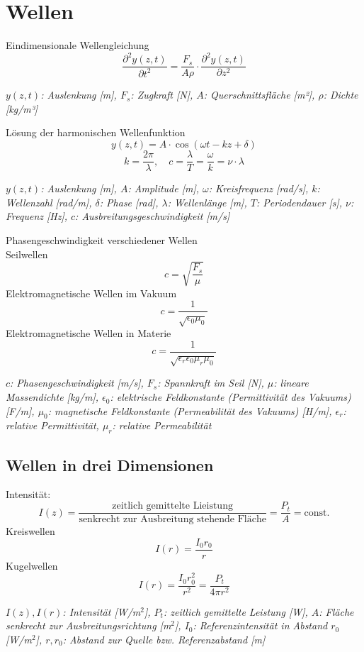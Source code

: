 \documentclass[a4paper,10pt]{article}
\newenvironment{displayformula}
{
	\begin{framed}
		\color{formulaColor}
	}
	{\end{framed}}
\newcommand{\formulalegend}[1]{%
	\par\vspace{0.5ex}%
	{{\color{legendColor}\RaggedRight\small\textit{#1}}}%
	\par\vspace{1.5ex}%
}
\begin{document}
\section{Wellen}

\begin{displayformula}
	Eindimensionale Wellengleichung
	\[
	\frac{\partial^2 y(z,t)}{\partial t^2} = \frac{F_s}{A \rho} \cdot \frac{\partial^2 y(z,t)}{\partial z^2}
	\]
\end{displayformula}
\formulalegend{
	\( y(z,t) \): Auslenkung [m], \( F_s \): Zugkraft [N], \( A \): Querschnittsfläche [m²], \( \rho \): Dichte [kg/m³]
}

\begin{displayformula}
	Lösung der harmonischen Wellenfunktion
	\[
	y(z, t) = A \cdot \cos(\omega t - kz + \delta)
	\]
	\[
	k = \frac{2\pi}{\lambda}, \quad c = \frac{\lambda}{T} = \frac{\omega}{k} = \nu \cdot \lambda
	\]
\end{displayformula}
\formulalegend{
	\( y(z,t) \): Auslenkung [m], \( A \): Amplitude [m], \( \omega \): Kreisfrequenz [rad/s], \( k \): Wellenzahl [rad/m], \( \delta \): Phase [rad], \( \lambda \): Wellenlänge [m], \( T \): Periodendauer [s], \( \nu \): Frequenz [Hz], \( c \): Ausbreitungsgeschwindigkeit [m/s]
}


\begin{displayformula}
	Phasengeschwindigkeit verschiedener Wellen \\ 
	Seilwellen
	\[
	c = \sqrt{\frac{F_s}{\mu}}
	\]
	Elektromagnetische Wellen im Vakuum
	\[
	c = \frac{1}{\sqrt{\epsilon_0 \mu_0}}
	\]
	Elektromagnetische Wellen in Materie
	\[
	c = \frac{1}{\sqrt{\epsilon_r \epsilon_0 \mu_r \mu_0}}
	\]
\end{displayformula}
\formulalegend{
	\( c \): Phasengeschwindigkeit [m/s], 
	\( F_s \): Spannkraft im Seil [N], 
	\( \mu \): lineare Massendichte [kg/m], 
	\( \epsilon_0 \): elektrische Feldkonstante (Permittivität des Vakuums) [F/m], 
	\( \mu_0 \): magnetische Feldkonstante (Permeabilität des Vakuums) [H/m], 
	\( \epsilon_r \): relative Permittivität, 
	\( \mu_r \): relative Permeabilität
}

\subsection{Wellen in drei Dimensionen}
\begin{displayformula}
	Intensität:
	\[
	I(z) = \frac{\text{zeitlich gemittelte Lieistung}}{\text{senkrecht zur Ausbreitung stehende Fläche}} = \frac{P_t}{A} = \text{const.}
	\]
	Kreiswellen
	\[
	I(r) = \frac{I_0r_0}{r}
	\]
	Kugelwellen
	\[
	I(r) = \frac{I_0r_0^2}{r^2} = \frac{P_t}{4\pi r^2}
	\]
\end{displayformula}
\formulalegend{
	\( I(z), I(r) \): Intensität [W/m\(^2\)], 
	\( P_t \): zeitlich gemittelte Leistung [W], 
	\( A \): Fläche senkrecht zur Ausbreitungsrichtung [m\(^2\)], 
	\( I_0 \): Referenzintensität in Abstand \( r_0 \) [W/m\(^2\)], 
	\( r, r_0 \): Abstand zur Quelle bzw. Referenzabstand [m]
}
\end{document}

